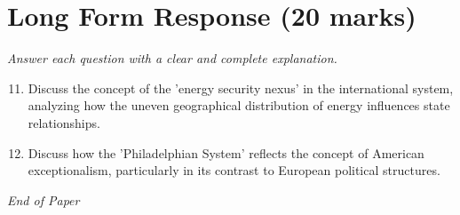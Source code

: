 \documentclass[12pt]{article}
\begin{document}
\section*{Long Form Response (20 marks)}
\textit{Answer each question with a clear and complete explanation.}
\begin{enumerate}[label=\arabic*.]
\setcounter{enumi}{10}
\item Discuss the concept of the 'energy security nexus' in the international system, analyzing how the uneven geographical distribution of energy influences state relationships.
\item Discuss how the 'Philadelphian System' reflects the concept of American exceptionalism, particularly in its contrast to European political structures.
\end{enumerate}

\vfill
\noindent\textit{End of Paper}
\end{document}

